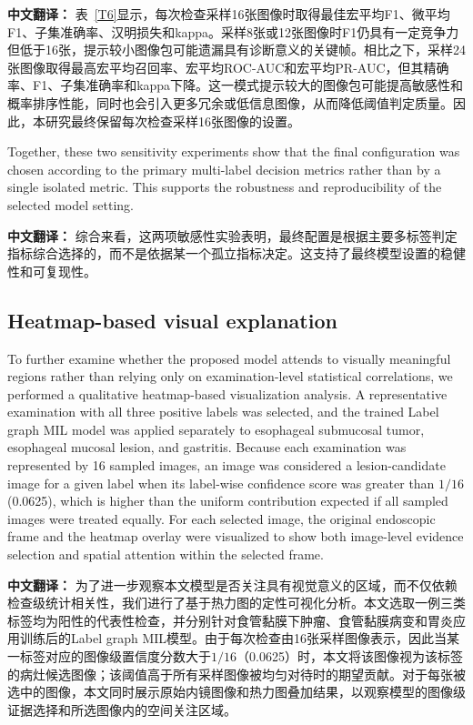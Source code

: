 \documentclass[Afour,sagev,times]{sagej}
\begin{document}
\textbf{中文翻译：} 表~\ref{T6}显示，每次检查采样16张图像时取得最佳宏平均F1、微平均F1、子集准确率、汉明损失和kappa。采样8张或12张图像时F1仍具有一定竞争力但低于16张，提示较小图像包可能遗漏具有诊断意义的关键帧。相比之下，采样24张图像取得最高宏平均召回率、宏平均ROC-AUC和宏平均PR-AUC，但其精确率、F1、子集准确率和kappa下降。这一模式提示较大的图像包可能提高敏感性和概率排序性能，同时也会引入更多冗余或低信息图像，从而降低阈值判定质量。因此，本研究最终保留每次检查采样16张图像的设置。

Together, these two sensitivity experiments show that the final configuration was chosen according to the primary multi-label decision metrics rather than by a single isolated metric. This supports the robustness and reproducibility of the selected model setting.

\textbf{中文翻译：} 综合来看，这两项敏感性实验表明，最终配置是根据主要多标签判定指标综合选择的，而不是依据某一个孤立指标决定。这支持了最终模型设置的稳健性和可复现性。

\subsection{Heatmap-based visual explanation}
To further examine whether the proposed model attends to visually meaningful regions rather than relying only on examination-level statistical correlations, we performed a qualitative heatmap-based visualization analysis. A representative examination with all three positive labels was selected, and the trained Label graph MIL model was applied separately to esophageal submucosal tumor, esophageal mucosal lesion, and gastritis. Because each examination was represented by 16 sampled images, an image was considered a lesion-candidate image for a given label when its label-wise confidence score was greater than $1/16$ (0.0625), which is higher than the uniform contribution expected if all sampled images were treated equally. For each selected image, the original endoscopic frame and the heatmap overlay were visualized to show both image-level evidence selection and spatial attention within the selected frame.

\textbf{中文翻译：} 为了进一步观察本文模型是否关注具有视觉意义的区域，而不仅依赖检查级统计相关性，我们进行了基于热力图的定性可视化分析。本文选取一例三类标签均为阳性的代表性检查，并分别针对食管黏膜下肿瘤、食管黏膜病变和胃炎应用训练后的Label graph MIL模型。由于每次检查由16张采样图像表示，因此当某一标签对应的图像级置信度分数大于$1/16$（0.0625）时，本文将该图像视为该标签的病灶候选图像；该阈值高于所有采样图像被均匀对待时的期望贡献。对于每张被选中的图像，本文同时展示原始内镜图像和热力图叠加结果，以观察模型的图像级证据选择和所选图像内的空间关注区域。
\end{document}
